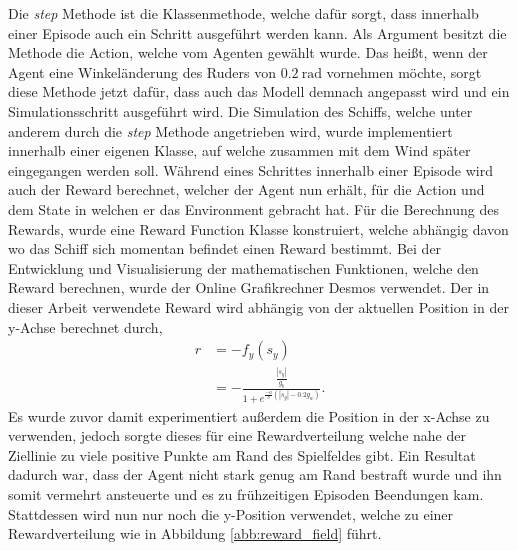 \documentclass[]{iat}
\begin{document}
Die \textit{step} Methode ist die Klassenmethode, welche dafür sorgt, dass innerhalb einer Episode auch ein Schritt ausgeführt werden kann. Als Argument besitzt die Methode die Action, welche vom Agenten gewählt wurde. Das heißt, wenn der Agent eine Winkeländerung des Ruders von $\SI{0.2}{\radian}$ vornehmen möchte, sorgt diese Methode jetzt dafür, dass auch das Modell demnach angepasst wird und ein Simulationsschritt ausgeführt wird. Die Simulation des Schiffs, welche unter anderem durch die \textit{step} Methode angetrieben wird, wurde implementiert innerhalb einer eigenen Klasse, auf welche zusammen mit dem Wind später eingegangen werden soll. Während eines Schrittes innerhalb einer Episode wird auch der Reward berechnet, welcher der Agent nun erhält, für die Action und dem State in welchen er das Environment gebracht hat. Für die Berechnung des Rewards, wurde eine Reward Function Klasse konstruiert, welche abhängig davon wo das Schiff sich momentan befindet einen Reward bestimmt. Bei der Entwicklung und Visualisierung der mathematischen Funktionen, welche den Reward berechnen, wurde der Online Grafikrechner Desmos \cite[]{desmos} verwendet. Der in dieser Arbeit verwendete Reward wird abhängig von der aktuellen Position in der y-Achse berechnet durch,
\begin{align}
    r & = -f_y(s_y)                                                          \\
      & = - \frac{\frac{|s_y|}{g_b}}{1 + e^{\frac{-a}{b}(|s_y| - 0.2 g_w)}}.
\end{align}
Es wurde zuvor damit experimentiert außerdem die Position in der x-Achse zu verwenden, jedoch sorgte dieses für eine Rewardverteilung welche nahe der Ziellinie zu viele positive Punkte am Rand des Spielfeldes gibt. Ein Resultat dadurch war, dass der Agent nicht stark genug am Rand bestraft wurde und ihn somit vermehrt ansteuerte und es zu frühzeitigen Episoden Beendungen kam. Stattdessen wird nun nur noch die y-Position verwendet, welche zu einer Rewardverteilung wie in Abbildung \ref{abb:reward_field} führt.
\end{document}
